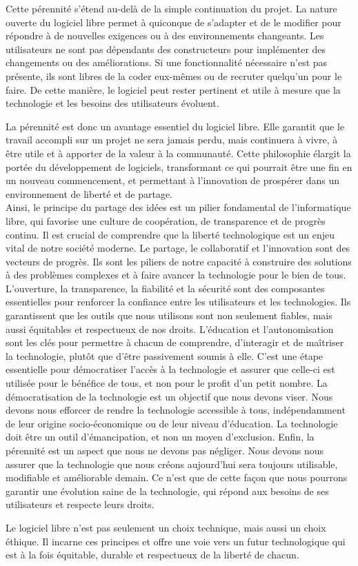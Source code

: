 Cette pérennité s'étend au-delà de la simple continuation du projet. La nature ouverte du logiciel libre permet à quiconque de s'adapter et de le modifier pour répondre à de nouvelles exigences ou à des environnements changeants. Les utilisateurs ne sont pas dépendants des constructeurs pour implémenter des changements ou des améliorations. Si une fonctionnalité nécessaire n'est pas présente, ils sont libres de la coder eux-mêmes ou de recruter quelqu'un pour le faire. De cette manière, le logiciel peut rester pertinent et utile à mesure que la technologie et les besoins des utilisateurs évoluent.

La pérennité est donc un avantage essentiel du logiciel libre. Elle garantit que le travail accompli sur un projet ne sera jamais perdu, mais continuera à vivre, à être utile et à apporter de la valeur à la communauté. Cette philosophie élargit la portée du développement de logiciels, transformant ce qui pourrait être une fin en un nouveau commencement, et permettant à l'innovation de prospérer dans un environnement de liberté et de partage.\\



Ainsi, le principe du partage des idées est un pilier fondamental de l'informatique libre, qui favorise une culture de coopération, de transparence et de progrès continu.
Il est crucial de comprendre que la liberté technologique est un enjeu vital de notre société moderne. Le partage, le collaboratif et l'innovation sont des vecteurs de progrès. Ils sont les piliers de notre capacité à construire des solutions à des problèmes complexes et à faire avancer la technologie pour le bien de tous.
L'ouverture, la transparence, la fiabilité et la sécurité sont des composantes essentielles pour renforcer la confiance entre les utilisateurs et les technologies. Ils garantissent que les outils que nous utilisons sont non seulement fiables, mais aussi équitables et respectueux de nos droits.
L'éducation et l'autonomisation sont les clés pour permettre à chacun de comprendre, d'interagir et de maîtriser la technologie, plutôt que d'être passivement soumis à elle. C'est une étape essentielle pour démocratiser l'accès à la technologie et assurer que celle-ci est utilisée pour le bénéfice de tous, et non pour le profit d'un petit nombre.
La démocratisation de la technologie est un objectif que nous devons viser. Nous devons nous efforcer de rendre la technologie accessible à tous, indépendamment de leur origine socio-économique ou de leur niveau d'éducation. La technologie doit être un outil d'émancipation, et non un moyen d'exclusion.
Enfin, la pérennité est un aspect que nous ne devons pas négliger. Nous devons nous assurer que la technologie que nous créons aujourd'hui sera toujours utilisable, modifiable et améliorable demain. Ce n'est que de cette façon que nous pourrons garantir une évolution saine de la technologie, qui répond aux besoins de ses utilisateurs et respecte leurs droits.

Le logiciel libre n'est pas seulement un choix technique, mais aussi un choix éthique. Il incarne ces principes et offre une voie vers un futur technologique qui est à la fois équitable, durable et respectueux de la liberté de chacun.

